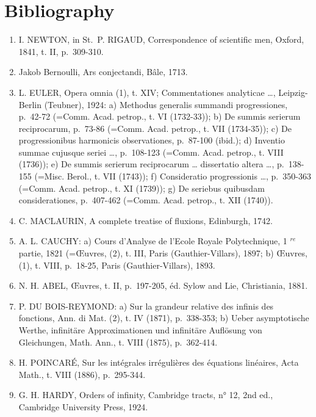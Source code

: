 \section*{Bibliography}
{}

\begin{enumerate}
\def\labelenumi{(\Roman{enumi})}
\item
  I. NEWTON, in St.~P. RIGAUD, Correspondence of scientific men, Oxford, 1841, t. II, p.~309-310.
\item
  Jakob Bernoulli, Ars conjectandi, Bâle, 1713.
\item
  L. EULER, Opera omnia (1), t. XIV; Commentationes analyticae \ldots, Leipzig-Berlin (Teubner), 1924: a) Methodus generalis summandi progressiones, p.~42-72 (=Comm. Acad. petrop., t. VI (1732-33)); b) De summis serierum reciprocarum, p.~73-86 (=Comm. Acad. petrop., t. VII (1734-35)); c) De progressionibus harmonicis observationes, p.~87-100 (ibid.); d) Inventio summae cujusque seriei \ldots, p.~108-123 (=Comm. Acad. petrop., t. VIII (1736)); e) De summis serierum reciprocarum \ldots{} dissertatio altera \ldots, p.~138-155 (=Misc. Berol., t. VII (1743)); f) Consideratio progressionis \ldots, p.~350-363 (=Comm. Acad. petrop., t. XI (1739)); g) De seriebus quibusdam considerationes, p.~407-462 (=Comm. Acad. petrop., t. XII (1740)).
\item
  C. MACLAURIN, A complete treatise of fluxions, Edinburgh, 1742.
\item
  A. L. CAUCHY: a) Cours d'Analyse de l'Ecole Royale Polytechnique, 1 \(^{re}\) partie, 1821 (=Œuvres, (2), t. III, Paris (Gauthier-Villars), 1897; b) Œuvres, (1), t. VIII, p.~18-25, Paris (Gauthier-Villars), 1893.
\item
  N. H. ABEL, Œuvres, t. II, p.~197-205, éd. Sylow and Lie, Christiania, 1881.
\item
  P. DU BOIS-REYMOND: a) Sur la grandeur relative des infinis des fonctions, Ann. di Mat. (2), t. IV (1871), p.~338-353; b) Ueber asymptotische Werthe, infinitäre Approximationen und infinitäre Auflösung von Gleichungen, Math. Ann., t. VIII (1875), p.~362-414.
\item
  H. POINCARÉ, Sur les intégrales irrégulières des équations linéaires, Acta Math., t. VIII (1886), p.~295-344.
\item
  G. H. HARDY, Orders of infinity, Cambridge tracts, n° 12, 2nd ed., Cambridge University Press, 1924.
\end{enumerate}

